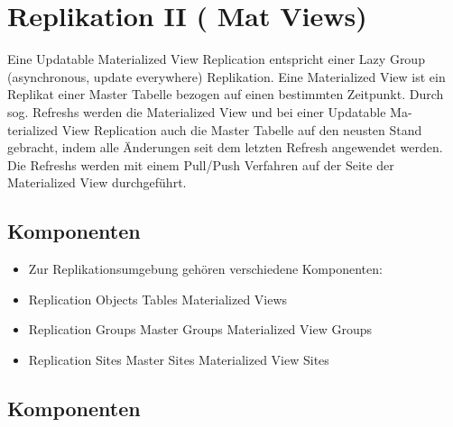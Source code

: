 \documentclass[a4paper,10pt,titlepage=false]{scrreprt}
\begin{document}

\chapter{Replikation II ( Mat Views)} %
\label{cha:replikation_ii}
Eine Updatable Materialized View Replication entspricht einer Lazy Group (asynchronous,
update everywhere) Replikation.
Eine Materialized View ist ein Replikat einer Master Tabelle bezogen auf einen bestimmten
Zeitpunkt. Durch sog. Refreshs werden die Materialized View und bei einer Updatable Ma-
terialized View Replication auch die Master Tabelle auf den neusten Stand gebracht, indem
alle Änderungen seit dem letzten Refresh angewendet werden. Die Refreshs werden mit
einem Pull/Push Verfahren auf der Seite der Materialized View durchgeführt.

\section{Komponenten} %
\begin{itemize}
  \item Zur Replikationsumgebung gehören verschiedene Komponenten:
\item Replication Objects
\subitem Tables
\subitem Materialized Views
\item Replication Groups
\subitem Master Groups
\subitem Materialized View Groups
\item Replication Sites
\subitem Master Sites
\subitem Materialized View Sites
\end{itemize}
\label{sec:komponenten}

\section{Komponenten} %
\label{sec:komponenten}
\end{document}
